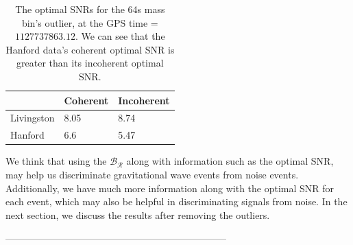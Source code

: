 \documentclass{article}
\begin{document}
 \begin{table}[h!]
 	\centering
 	\caption{The optimal SNRs for the 64s mass bin's outlier, at the GPS time = $1127737863.12$. We can see that the Hanford data's coherent optimal SNR is greater than its incoherent optimal SNR.}
 	\label{table:64s}
 	\begin{tabular}{|l|ll|}
 		\hline
 		& \textbf{Coherent} & \textbf{Incoherent} \\ \hline
 		Livingston & 8.05              & 8.74                \\
 		Hanford    & 6.6               & 5.47                \\ \hline
 	\end{tabular}
 \end{table}
 
 
 We think that using the $\mathcal{B_{R}}$ along with information such as the optimal SNR, may help us discriminate gravitational wave events from noise events. Additionally, we have much more information along with the optimal SNR for each event, which may also be helpful in discriminating signals from noise. In the next section, we discuss the results after removing the outliers.
 
 

 
 
 
 
---------------------------------------------------------------------
 
 
 
 
\end{document}
